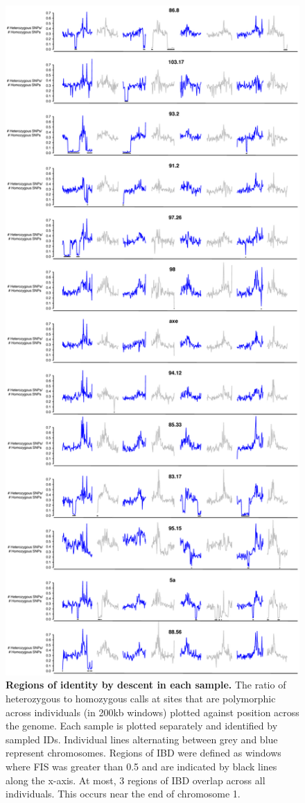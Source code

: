 \begin{figure}[ht!]
      \centering
       \includegraphics[scale=0.1]{Ch2FigS4}
    \caption{\textbf{Regions of identity by descent in each sample.} The ratio of heterozygous to homozygous calls at sites that are polymorphic across individuals (in 200kb windows) plotted against position across the genome. Each sample is plotted separately and identified by sampled IDs. Individual lines alternating between grey and blue represent chromosomes. Regions of IBD were defined as windows where FIS was greater than 0.5 and are indicated by black lines along the x-axis. At most, 3 regions of IBD overlap across all individuals. This occurs near the end of chromosome 1.}
    \label{fig:figS4}
\end{figure}

